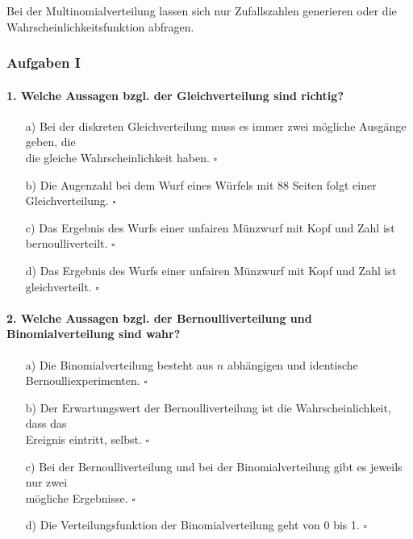 \documentclass[a4paper]{article}
\newcommand\dangersign[1][2ex]{%
  \renewcommand\stacktype{L}%
  \scaleto{\stackon[1.3pt]{\color{red}$\triangle$}{\tiny !}}{#1}%
}
\begin{document}
\noindent \dangersign[3ex] Bei der Multinomialverteilung lassen sich nur Zufallszahlen generieren oder die Wahrscheinlichkeitsfunktion abfragen.

\clearpage


\subsubsection{Aufgaben I}
\paragraph{1. Welche Aussagen bzgl. der Gleichverteilung sind richtig? }
\begin{itemize}
    \item[a)] Bei der diskreten Gleichverteilung muss es immer zwei mögliche Ausgänge geben, die\\ die gleiche Wahrscheinlichkeit haben. \hfill $\square$
    \item[b)] Die Augenzahl bei dem Wurf eines Würfels mit 88 Seiten folgt einer Gleichverteilung. \hfill $\square$
    \item[c)] Das Ergebnis des Wurfs einer unfairen Münzwurf mit Kopf und Zahl ist bernoulliverteilt. \hfill $\square$
    \item[d)] Das Ergebnis des Wurfs einer unfairen Münzwurf mit Kopf und Zahl ist gleichverteilt. \hfill $\square$
\end{itemize}

\paragraph{2. Welche Aussagen bzgl. der Bernoulliverteilung und Binomialverteilung sind wahr?}
\begin{itemize}
    \item[a)] Die Binomialverteilung besteht aus $n$ abhängigen und identische Bernoulliexperimenten. \hfill $\square$
    \item[b)] Der Erwartungswert der Bernoulliverteilung ist die Wahrscheinlichkeit, dass das\\ Ereignis eintritt, selbst. \hfill $\square$
    \item[c)] Bei der Bernoulliverteilung und bei der Binomialverteilung gibt es jeweils nur zwei\\ mögliche Ergebnisse. \hfill $\square$
    \item[d)] Die Verteilungsfunktion der Binomialverteilung geht von 0 bis 1. \hfill $\square$
\end{itemize}
\end{document}
